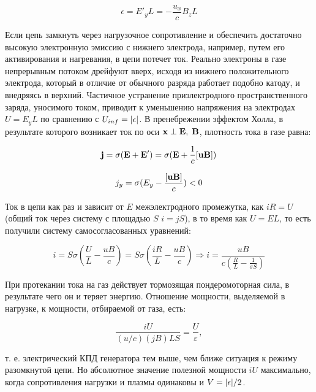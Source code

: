\documentclass[10pt, a4paper]{article}
\begin{document}
\begin{equation*}
	\epsilon = E'_{y}L = -\frac{u_x}{c}B_z L
\end{equation*}

Если цепь замкнуть через нагрузочное сопротивление и обеспечить достаточно высокую электронную эмиссию с нижнего электрода, например, путем его активирования и нагревания, в цепи потечет ток. Реально электроны в газе непрерывным потоком дрейфуют вверх, исходя из нижнего положительного электрода, который в отличие от обычного разряда работает подобно катоду, и внедряясь в верхний. Частичное устранение приэлектродного пространственного заряда, уносимого током, приводит к уменьшению напряжения на электродах $U = E_y L$ по сравнению с $U_{inf}=\abs{\epsilon}$. В пренебрежении эффектом Холла, в результате которого возникает ток по оси $\vb{x} \perp \vb{E},\;\vb{B}$, плотность тока в газе равна:

\begin{equation*}
	\vb{j} = \sigma(\vb{E} + \vb{E}')=\sigma(\vb{E} + \frac{1}{c} [\vb{u}\vb{B}])
\end{equation*}

\begin{equation*}
	j_y = \sigma(E_y-\frac{[\vb{u}\vb{B}]}{c})<0
\end{equation*}

Ток в цепи как раз и зависит от $E$ межэлектродного промежутка, как $iR=U$ (общий ток через систему с площадью $S$ $i=jS$), в то время как $U=EL$, то есть получили систему самосогласованных уравнений:

\begin{equation*}
	i = S \sigma\left(\frac{U}{L}-\frac{uB}{c}\right) = S \sigma \left(\frac{iR}{L}-\frac{uB}{c}\right) \Rightarrow i = \frac{u B}{c\left(\frac{R}{L}-\frac{1}{\sigma S}\right)}
\end{equation*}

При протекании тока на газ действует тормозящая пондеромоторная сила, в результате чего он и теряет энергию. Отношение мощности, выделяемой в нагрузке, к мощности, отбираемой от газа, есть:

\begin{equation*}
	\frac{iU}{(u/c)(jB)LS}=\frac{U}{\varepsilon},
\end{equation*}

т. е. электрический КПД генератора тем выше, чем ближе ситуация к режиму разомкнутой цепи. Но абсолютное значение полезной мощности $iU$ максимально, когда сопротивления нагрузки и плазмы одинаковы и $V=\abs{\epsilon}/2$.
\end{document}

